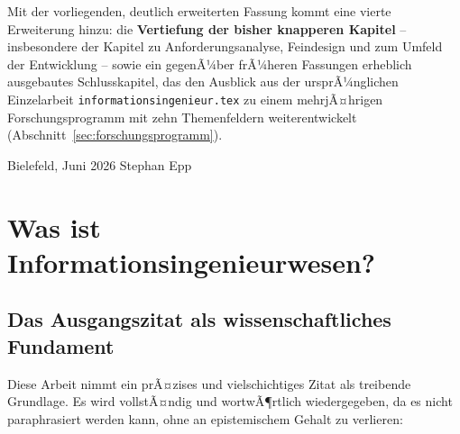 ﻿\documentclass[a4paper,12pt]{report}
\theoremstyle{definition}
\begin{document}
\noindent
Mit der vorliegenden, deutlich erweiterten Fassung kommt eine vierte
Erweiterung hinzu: die \textbf{Vertiefung der bisher knapperen Kapitel} --
insbesondere der Kapitel zu Anforderungsanalyse, Feindesign und zum Umfeld
der Entwicklung -- sowie ein gegenÃ¼ber frÃ¼heren Fassungen erheblich
ausgebautes Schlusskapitel, das den Ausblick aus der ursprÃ¼nglichen
Einzelarbeit \texttt{informationsingenieur.tex} zu einem mehrjÃ¤hrigen
Forschungsprogramm mit zehn Themenfeldern weiterentwickelt
(Abschnitt~\ref{sec:forschungsprogramm}).

\bigskip
\noindent Bielefeld, Juni 2026 \hfill Stephan Epp

\chapter{Was ist Informationsingenieurwesen?}

\section{Das Ausgangszitat als wissenschaftliches Fundament}
\label{sec:ausgangszitat}

Diese Arbeit nimmt ein prÃ¤zises und vielschichtiges Zitat als treibende Grundlage. Es wird
vollstÃ¤ndig und wortwÃ¶rtlich wiedergegeben, da es nicht paraphrasiert werden kann, ohne an
epistemischem Gehalt zu verlieren:
\end{document}
